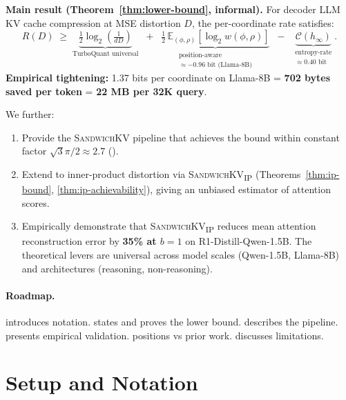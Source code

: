 \documentclass[11pt]{article}
\theoremstyle{definition}
\newcommand{\E}{\mathbb{E}}
\newcommand{\hinf}{h_\infty}
\newcommand{\eq}{\textsc{SandwichKV}}
\newcommand{\eqp}{\textsc{SandwichKV}\textsubscript{IP}}
\begin{document}
\begin{result}
\textbf{Main result (Theorem~\ref{thm:lower-bound}, informal).} For decoder LLM KV cache compression at MSE distortion $D$, the per-coordinate rate satisfies:
\begin{equation*}
R(D) \;\ge\; \underbrace{\tfrac{1}{2}\log_2\!\left(\tfrac{1}{dD}\right)}_{\text{TurboQuant universal}}
\;\;+\;\;
\underbrace{\tfrac{1}{2}\,\E_{(\phi,\rho)}[\log_2 w(\phi,\rho)]}_{\substack{\text{position-aware} \\ \approx -0.96 \text{ bit (Llama-8B)}}}
\;\;-\;\;
\underbrace{\mathcal{C}(\hinf)}_{\substack{\text{entropy-rate} \\ \approx 0.40 \text{ bit}}}.
\end{equation*}
\textbf{Empirical tightening:} 1.37 bits per coordinate on Llama-8B = \textbf{702 bytes saved per token} = \textbf{22 MB per 32K query}.
\end{result}

\noindent We further:
\begin{enumerate}
\item Provide the \eq{} pipeline that achieves the bound within constant factor $\sqrt{3}\pi/2 \approx 2.7$ ().
\item Extend to inner-product distortion via \eqp{} (Theorems~\ref{thm:ip-bound}, \ref{thm:ip-achievability}), giving an unbiased estimator of attention scores.
\item Empirically demonstrate that \eqp{} reduces mean attention reconstruction error by \textbf{35\% at $b{=}1$} on R1-Distill-Qwen-1.5B. The theoretical levers are universal across model scales (Qwen-1.5B, Llama-8B) and architectures (reasoning, non-reasoning).
\end{enumerate}

\paragraph{Roadmap.}  introduces notation.  states and proves the lower bound.  describes the pipeline.  presents empirical validation.  positions vs prior work.  discusses limitations.

\section{Setup and Notation}
\label{sec:setup}
\end{document}

